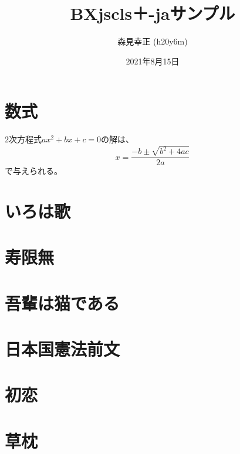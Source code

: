 \documentclass[xelatex,ja=xelatexja,a4paper,10pt,twocolumn]{bxjsarticle}
\title{BXjscls＋\XeLaTeX-jaサンプル}
\author{森見幸正 (h20y6m)}
\date{2021年8月15日}
\begin{document}
\maketitle

\section{数式}

2次方程式$ax^2+bx+c=0$の解は、
\[ x = \frac{-b\pm\sqrt{b^2+4ac}}{2a} \]
で与えられる。

\section{いろは歌}

\section{寿限無}

\section{吾輩は猫である}

\section{日本国憲法前文}

\section{初恋}

\section{草枕}
\end{document}
